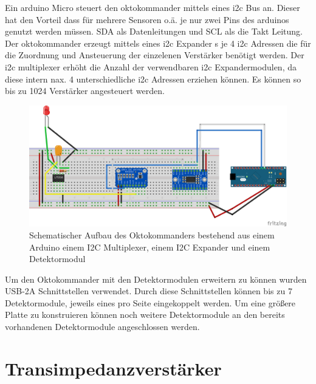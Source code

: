 Ein arduino Micro steuert den oktokommander mittels eines i2c Bus an. Dieser hat den Vorteil dass für mehrere Sensoren o.ä. je nur zwei Pins des arduinos genutzt werden müssen. SDA als Datenleitungen und SCL als die Takt Leitung.
Der oktokommander erzeugt mittels eines i2c Expander s je 4 i2c Adressen die für die Zuordnung und Ansteuerung der einzelenen Verstärker benötigt werden.
Der i2c multiplexer erhöht die Anzahl der verwendbaren i2c Expandermodulen, da diese intern nax. 4 unterschiedliche i2c Adressen erziehen können. Es können so bis zu 1024 Verstärker angesteuert werden.
\begin{figure}[h]
	\centering
	\includegraphics[scale=0.5]{../figures/oktokommander.png}
	\caption{Schematischer Aufbau des Oktokommanders bestehend aus einem Arduino einem I2C Multiplexer, einem I2C Expander und einem Detektormodul}
	\label{fig:oktokommander}
\end{figure}
Um den Oktokommander mit den Detektormodulen erweitern zu können wurden USB-2A Schnittstellen verwendet. Durch diese Schnittstellen können bis zu 7 Detektormodule, jeweils eines pro Seite  eingekoppelt werden. Um eine größere Platte zu konstruieren können noch weitere Detektormodule an den bereits vorhandenen Detektormodule angeschlossen werden.
\newpage



\section{Transimpedanzverstärker}
\label{sec:Transimpedanzverstärker}

